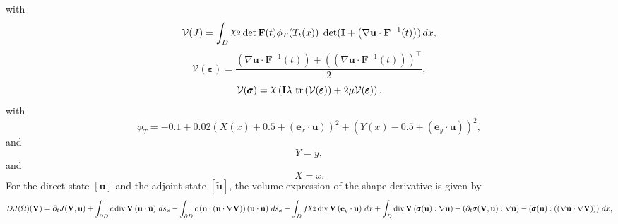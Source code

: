 \documentclass[preview]{standalone}
\let\oldcdot\cdot
\let\cdot\oldcdot
\begin{document}
with
\begin{dmath*}
\mathcal V(J) =  \int_{D} \raisebox{\depth}{$\chi_2$}  \operatorname{det}\mathbf F( t )  \phi_{T}(T_t(x))  \;\operatorname{det}(\mathbf{I} + \left(  \nabla {\mathbf{ u }}  \cdot  \mathbf F^{-1}(t) \right))  \,dx,
 \end{dmath*}
\begin{dmath*}
\mathcal V(\pmb \varepsilon) = \frac{\left(  \nabla {\mathbf{ u }}  \cdot  \mathbf F^{-1}(t) \right) +  \left( \left(  \nabla {\mathbf{ u }}  \cdot  \mathbf F^{-1}(t) \right) \right)^\top }{2},
 \end{dmath*}
\begin{dmath*}
\mathcal V(\pmb \sigma) = \raisebox{\depth}{$\chi$} \left(\mathbf{I} \lambda  \,\operatorname{tr}\left(\mathcal V(\pmb \varepsilon)\right)  + 2 \mu \mathcal V(\pmb \varepsilon)\right).
 \end{dmath*}
with 
\begin{dmath*}
\phi_{T} = -0.1 + 0.02 \left(X(x) + 0.5 + \left( \mathbf e_x \cdot {\mathbf{ u }} \right)\right)^{2} + \left(Y(x) - 0.5 + \left( \mathbf e_y \cdot {\mathbf{ u }} \right)\right)^{2},\end{dmath*}
and\begin{dmath*}
Y = y,\end{dmath*}
and\begin{dmath*}
X = x.\end{dmath*}
For the direct state $\left[ {\mathbf{ u }}\right]$ and the adjoint state $\left[ \tilde{\mathbf{ u }}\right]$, the volume expression of the shape derivative is given by
\begin{dmath*}
DJ(\Omega)(\mathbf V) = \partial_{t} J({\mathbf V},{\mathbf{ u }}) +  \int_{\partial D} c \operatorname{div} {\mathbf V} \left( {\mathbf{ u }} \cdot \tilde{\mathbf{ u }} \right) \,ds_x -  \int_{\partial D} c \left( \mathbf n \cdot \left( \mathbf n \cdot  \nabla {\mathbf V}  \right) \right) \left( {\mathbf{ u }} \cdot \tilde{\mathbf{ u }} \right) \,ds_x -  \int_{D} f \raisebox{\depth}{$\chi_2$} \operatorname{div} {\mathbf V} \left( \mathbf e_y \cdot \tilde{\mathbf{ u }} \right) \,dx +  \int_{D} \operatorname{div} {\mathbf V} \left( \pmb \sigma({\mathbf{ u }}) \mathrel{:}  \nabla \tilde{\mathbf{ u }}  \right) + \left( \partial_{t} \pmb \sigma({\mathbf V},{\mathbf{ u }}) \mathrel{:}  \nabla \tilde{\mathbf{ u }}  \right) - \left( \pmb \sigma({\mathbf{ u }}) \mathrel{:} \left( \left(  \nabla \tilde{\mathbf{ u }}  \cdot  \nabla {\mathbf V}  \right) \right)\right) \,dx , 
\end{dmath*}
\end{document}
